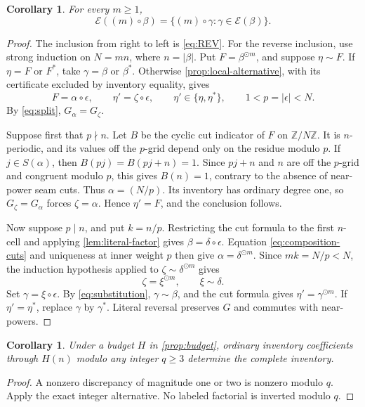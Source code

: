 \documentclass[11pt,a4paper]{amsart}
\numberwithin{equation}{section}
\theoremstyle{plain}
\newtheorem{corollary}[theorem]{Corollary}
\theoremstyle{definition}
\newcommand{\Z}{\mathbb Z}
\newcommand{\Ec}{\mathcal E}
\begin{document}
\begin{corollary}\label{cor:class}
For every \(m\ge1\),
\[
\Ec((m)\circ\beta)
=\{(m)\circ\gamma:\gamma\in\Ec(\beta)\}.
\]
\end{corollary}
\begin{proof}
The inclusion from right to left is \eqref{eq:REV}.
For the reverse inclusion, use strong induction on \(N=mn\), where
\(n=|\beta|\).  Put \(F=\beta^{\odot m}\), and suppose \(\eta\sim F\).
If \(\eta=F\) or \(F^*\), take \(\gamma=\beta\) or \(\beta^*\).
Otherwise \cref{prop:local-alternative}, with its certificate excluded
by inventory equality, gives
\[
F=\alpha\circ\epsilon,\qquad
\eta'=\zeta\circ\epsilon,\qquad
\eta'\in\{\eta,\eta^*\},\qquad
1<p=|\epsilon|<N.
\]
By \eqref{eq:split}, \(G_\alpha=G_\zeta\).

Suppose first that \(p\nmid n\).  Let \(B\) be the cyclic cut indicator
of \(F\) on \(\Z/N\Z\).  It is \(n\)-periodic, and its values off the
\(p\)-grid depend only on the residue modulo \(p\).
If \(j\in S(\alpha)\), then \(B(pj)=B(pj+n)=1\).
Since \(pj+n\) and \(n\) are off the \(p\)-grid and congruent modulo
\(p\), this gives \(B(n)=1\), contrary to the absence of near-power
seam cuts.  Thus \(\alpha=(N/p)\).
Its inventory has ordinary degree one, so \(G_\zeta=G_\alpha\)
forces \(\zeta=\alpha\).  Hence \(\eta'=F\), and the conclusion follows.

Now suppose \(p\mid n\), and put \(k=n/p\).
Restricting the cut formula to the first \(n\)-cell and applying
\cref{lem:literal-factor} gives \(\beta=\delta\circ\epsilon\).
Equation \eqref{eq:composition-cuts} and uniqueness at inner weight
\(p\) then give \(\alpha=\delta^{\odot m}\).
Since \(mk=N/p<N\), the induction hypothesis applied to
\(\zeta\sim\delta^{\odot m}\) gives
\[
\zeta=\xi^{\odot m},\qquad \xi\sim\delta.
\]
Set \(\gamma=\xi\circ\epsilon\).
By \eqref{eq:substitution}, \(\gamma\sim\beta\), and the cut formula gives
\(\eta'=\gamma^{\odot m}\).
If \(\eta'=\eta^*\), replace \(\gamma\) by \(\gamma^*\).
Literal reversal preserves \(G\) and commutes with near-powers.
\end{proof}

\begin{corollary}\label{cor:modular-budget}
Under a budget \(H\) in \cref{prop:budget}, ordinary inventory coefficients
through \(H(n)\) modulo any integer \(q\ge3\) determine the complete inventory.
\end{corollary}
\begin{proof}
A nonzero discrepancy of magnitude one or two is nonzero modulo \(q\).
Apply the exact integer alternative.  No labeled factorial is inverted
modulo \(q\).
\end{proof}
\end{document}
